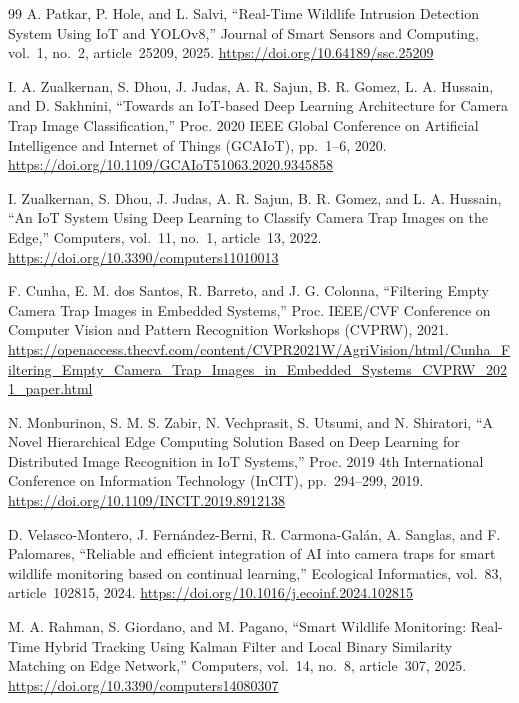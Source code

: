 \begin{thebibliography}{99}
  A. Patkar, P. Hole, and L. Salvi,
  ``Real-Time Wildlife Intrusion Detection System Using IoT and YOLOv8,''
  Journal of Smart Sensors and Computing, vol.~1, no.~2, article~25209, 2025.
  \url{https://doi.org/10.64189/ssc.25209}

  I. A. Zualkernan, S. Dhou, J. Judas, A. R. Sajun, B. R. Gomez, L. A. Hussain, and D. Sakhnini,
  ``Towards an IoT-based Deep Learning Architecture for Camera Trap Image Classification,''
  Proc. 2020 IEEE Global Conference on Artificial Intelligence and Internet of Things (GCAIoT),
  pp.~1--6, 2020.
  \url{https://doi.org/10.1109/GCAIoT51063.2020.9345858}

  I. Zualkernan, S. Dhou, J. Judas, A. R. Sajun, B. R. Gomez, and L. A. Hussain,
  ``An IoT System Using Deep Learning to Classify Camera Trap Images on the Edge,''
  Computers, vol.~11, no.~1, article~13, 2022.
  \url{https://doi.org/10.3390/computers11010013}

  F. Cunha, E. M. dos Santos, R. Barreto, and J. G. Colonna,
  ``Filtering Empty Camera Trap Images in Embedded Systems,''
  Proc. IEEE/CVF Conference on Computer Vision and Pattern Recognition Workshops (CVPRW), 2021.
  \url{https://openaccess.thecvf.com/content/CVPR2021W/AgriVision/html/Cunha_Filtering_Empty_Camera_Trap_Images_in_Embedded_Systems_CVPRW_2021_paper.html}

  N. Monburinon, S. M. S. Zabir, N. Vechprasit, S. Utsumi, and N. Shiratori,
  ``A Novel Hierarchical Edge Computing Solution Based on Deep Learning for Distributed Image Recognition in IoT Systems,''
  Proc. 2019 4th International Conference on Information Technology (InCIT),
  pp.~294--299, 2019.
  \url{https://doi.org/10.1109/INCIT.2019.8912138}

  D. Velasco-Montero, J. Fern\'andez-Berni, R. Carmona-Gal\'an, A. Sanglas, and F. Palomares,
  ``Reliable and efficient integration of AI into camera traps for smart wildlife monitoring based on continual learning,''
  Ecological Informatics, vol.~83, article~102815, 2024.
  \url{https://doi.org/10.1016/j.ecoinf.2024.102815}

  M. A. Rahman, S. Giordano, and M. Pagano,
  ``Smart Wildlife Monitoring: Real-Time Hybrid Tracking Using Kalman Filter and Local Binary Similarity Matching on Edge Network,''
  Computers, vol.~14, no.~8, article~307, 2025.
  \url{https://doi.org/10.3390/computers14080307}

\end{thebibliography}
